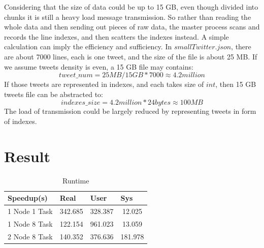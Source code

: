 \documentclass[11pt]{article}
\begin{document}
Considering that the size of data could be up to 15 GB, even though divided into chunks it is still a heavy load message transmission. So rather than reading the whole data and then sending out pieces of raw data, the master process scans and records the line indexes, and then scatters the indexes instead. A simple calculation can imply the efficiency and sufficiency. In $smallTwitter.json$, there are 
about 7000 lines, each is one tweet, and the size of the file is about 25 MB. If we assume tweets density is even, a 15 GB file may contains: \[tweet\_num = 25MB / 15GB * 7000 \approx 4.2million\] If those tweets are represented in indexes, and each takes size of $int$, then 15 GB tweets file can be abstracted to: \[indexes\_size = 4.2million * 24bytes \approx 100MB \] The load of transmission could be largely reduced by representing tweets in form of indexes. 



\section{Result}

\begin{table}[]
\begin{tabular}{c|ccc}
\multicolumn{1}{l|}{Speedup(s)} & \multicolumn{1}{l}{Real} & \multicolumn{1}{l}{User} & \multicolumn{1}{l}{Sys} \\ \hline
1 Node 1 Task                   & 342.685                  & 328.387                  & 12.025                  \\ \hline
1 Node 8 Task                   & 122.154                  & 961.023                  & 13.059                  \\ \hline
2 Node 8 Task                   & 140.352                  & 376.636                  & 181.978                
\end{tabular}
\caption{Runtime}
\label{Runtime}
\end{table}
\end{document}
